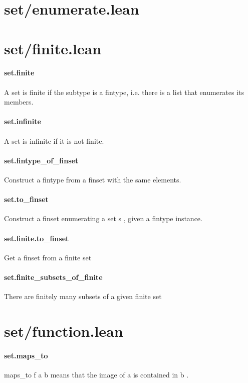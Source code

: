 \documentclass{article}
\begin{document}
\section{set/enumerate.lean}\section{set/finite.lean}\paragraph{set.finite}
\par
A set is finite if the subtype is a fintype, i.e. there is a
list that enumerates its members.
\paragraph{set.infinite}
\par
A set is infinite if it is not finite.
\paragraph{set.fintype\_of\_finset}
\par
Construct a fintype from a finset with the same elements.
\paragraph{set.to\_finset}
\par
Construct a finset enumerating a set 
\colorbox[RGB]{253,246,227}{{{{\color[RGB]{101, 123, 131} s }}}}, given a 
\colorbox[RGB]{253,246,227}{{{{\color[RGB]{101, 123, 131} fintype }}}} instance.
\paragraph{set.finite.to\_finset}
\par
Get a finset from a finite set
\paragraph{set.finite\_subsets\_of\_finite}
\par
There are finitely many subsets of a given finite set
\section{set/function.lean}\paragraph{set.maps\_to}
\par
\colorbox[RGB]{253,246,227}{{{{\color[RGB]{101, 123, 131} maps\_to f a b }}}} means that the image of 
\colorbox[RGB]{253,246,227}{{{{\color[RGB]{101, 123, 131} a }}}} is contained in 
\colorbox[RGB]{253,246,227}{{{{\color[RGB]{101, 123, 131} b }}}}.
\end{document}
